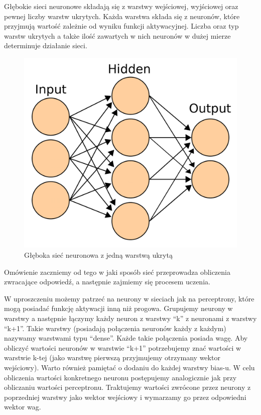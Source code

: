 \documentclass{article}
\begin{document}
Głębokie sieci neuronowe składają się z warstwy wejściowej, wyjściowej oraz pewnej liczby warstw ukrytych.
Każda warstwa składa się z neuronów, które przyjmują wartość zależnie od wyniku funkcji aktywacyjnej.
Liczba oraz typ warstw ukrytych a także ilość zawartych w nich neuronów w dużej mierze determinuje działanie sieci.
\begin{figure}[H]
    \centering
    \includegraphics[width=\linewidth]{"images/dnn.png"}
    \caption{Głęboka sieć neuronowa z jedną warstwą ukrytą}
\end{figure}
Omówienie zaczniemy od tego w jaki sposób sieć przeprowadza obliczenia zwracające odpowiedź, a następnie zajmiemy się procesem uczenia.

W uproszczeniu możemy patrzeć na neurony w sieciach jak na perceptrony, które mogą posiadać funkcję aktywacji inną niż progowa.
Grupujemy neurony w warstwy a następnie łączymy każdy neuron z warstwy ``k'' z neuronami z warstwy ``k+1''. Takie warstwy (posiadają połączenia neuronów każdy z każdym) nazywamy warstwami typu ``dense''.
Każde takie połączenia posiada wagę.
Aby obliczyć wartości neuronów w warstwie ``k+1'' potrzebujemy znać wartości w warstwie k-tej (jako warstwę pierwszą przyjmujemy otrzymany wektor wejściowy).
Warto również pamiętać o dodaniu do każdej warstwy bias-u.
W celu obliczenia wartości konkretnego neuronu postępujemy analogicznie jak przy obliczaniu wartości perceptronu.
Traktujemy wartości zwrócone przez neurony z poprzedniej warstwy jako wektor wejściowy i wymarzamy go przez odpowiedni wektor wag.
\end{document}
